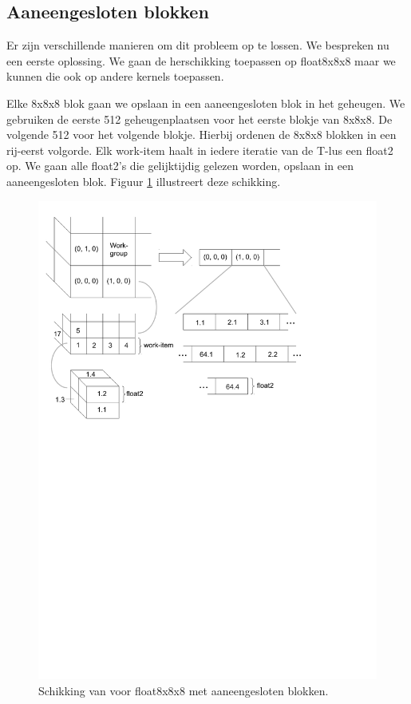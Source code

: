 \subsection{Aaneengesloten blokken}
Er zijn verschillende manieren om dit probleem op te lossen. We bespreken nu een eerste oplossing. We gaan de herschikking toepassen op float8x8x8 maar we kunnen die ook op andere kernels toepassen.

Elke 8x8x8 blok gaan we opslaan in een aaneengesloten blok in het geheugen. We gebruiken de eerste 512 geheugenplaatsen voor het eerste blokje van 8x8x8. De volgende 512 voor het volgende blokje. Hierbij ordenen de 8x8x8 blokken in een rij-eerst volgorde. Elk work-item haalt in iedere iteratie van de T-lus een float2 op. We gaan alle float2's die gelijktijdig gelezen worden, opslaan in een aaneengesloten blok. Figuur \ref{remap8} illustreert deze schikking.

\begin{figure}
\centering
\includegraphics[width=\textwidth, trim=0 16cm 4cm 0, clip]{remap8}
\caption{\label{remap8}Schikking van \TT{} voor float8x8x8 met aaneengesloten blokken.}
\end{figure}

